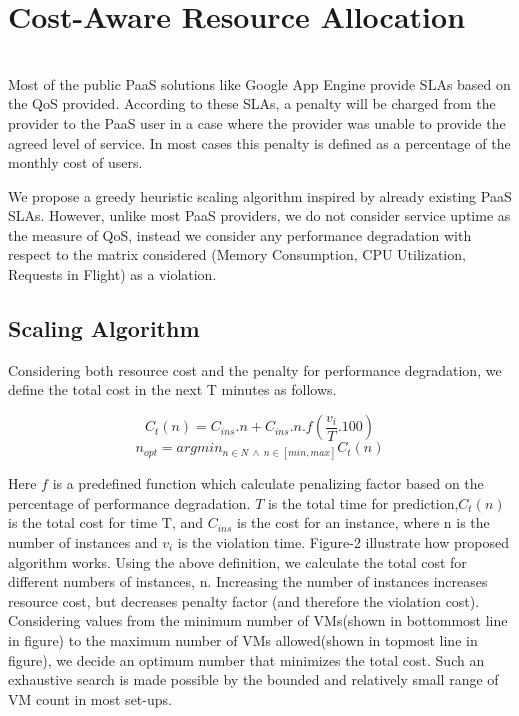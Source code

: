 \section{Cost-Aware Resource Allocation}\\
Most of the public PaaS solutions like Google App Engine provide SLAs based on the QoS provided. According to these SLAs, a penalty will be charged from the provider to the PaaS user in a case where the provider was unable to provide the agreed level of service. In most cases this penalty is defined as a percentage of the monthly cost of users.

We propose a greedy heuristic scaling algorithm inspired by already existing PaaS SLAs. However, unlike most PaaS providers, we do not consider service uptime as the measure of QoS, instead we consider any performance degradation with respect to the matrix considered (Memory Consumption, CPU Utilization, Requests in Flight) as a violation.

\subsection{Scaling Algorithm}
Considering both resource cost and the penalty for performance degradation, we define the total cost in the next T minutes as follows.

\textbf{$$ C_t(n) = C_{ins}.n  + C_{ins} . n . f(\frac{v_i}{T}.100) $$}
\textbf{$$n_{opt} = argmin_{n \in N \ \land \ n \in [min, max]}C_t(n)$$} 


Here $f$ is a predefined function which calculate penalizing factor based on the percentage of performance degradation. $T$ is the total time for prediction,$C_t(n)$ is the total cost for time T, and $C_{ins}$ is the cost for an instance, where n is the number of instances and $v_i$ is the violation time. Figure-2 illustrate how proposed algorithm works. Using the above definition, we calculate the total cost for different numbers of instances, n. Increasing the number of instances increases resource cost, but decreases penalty factor (and therefore the violation cost). Considering values from the minimum number of VMs(shown in bottommost line in figure) to the maximum number of VMs allowed(shown in topmost line in figure), we decide an optimum number that minimizes the total cost. Such an exhaustive search is made possible by the bounded and relatively small range of VM count in most set-ups.